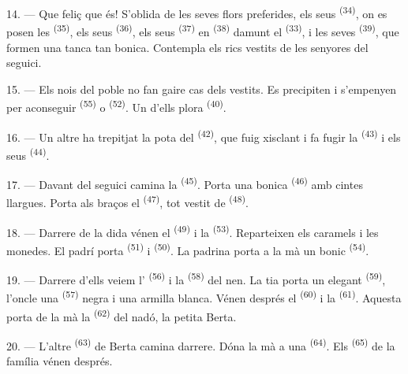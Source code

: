 14. --- Que feliç que és! S'oblida de les seves flors preferides, els seus
 \textsuperscript{(34)}, on es posen les 
\textsuperscript{(35)}, els seus  \textsuperscript{(36)}, els
seus  \textsuperscript{(37)} en 
\textsuperscript{(38)} damunt el  \textsuperscript{(33)}, i les seves
 \textsuperscript{(39)}, que formen una tanca tan bonica. Contempla
els rics vestits de les senyores del seguici.

15. --- Els nois del poble no fan gaire cas dels vestits. Es precipiten i
s'empenyen per aconseguir  \textsuperscript{(55)} o
 \textsuperscript{(52)}. Un d'ells plora
\textsuperscript{(40)}.

16. --- Un altre ha trepitjat la pota del  \textsuperscript{(42)}, que
fuig xisclant i fa fugir la  \textsuperscript{(43)} i els seus
 \textsuperscript{(44)}.

\VUsaut{5.0mm}
\VUsaut{4.0mm}

17. --- Davant del seguici camina la  \textsuperscript{(45)}. Porta
una bonica  \textsuperscript{(46)} amb cintes llargues. Porta als
braços el  \textsuperscript{(47)}, tot vestit de 
\textsuperscript{(48)}.

18. --- Darrere de la dida vénen el  \textsuperscript{(49)} i la
 \textsuperscript{(53)}. Reparteixen els caramels i les monedes.
El padrí porta  \textsuperscript{(51)} i 
\textsuperscript{(50)}. La padrina porta a la mà un bonic 
\textsuperscript{(54)}.

19. --- Darrere d'ells veiem l' \textsuperscript{(56)} i la
 \textsuperscript{(58)} del nen. La tia porta un elegant
 \textsuperscript{(59)}, l'oncle una 
\textsuperscript{(57)} negra i una armilla blanca. Vénen després el 
\textsuperscript{(60)} i la  \textsuperscript{(61)}. Aquesta porta
de la mà la  \textsuperscript{(62)} del nadó, la petita Berta.

20. --- L'altre  \textsuperscript{(63)} de Berta camina darrere. Dóna
la mà a una  \textsuperscript{(64)}. Els 
\textsuperscript{(65)} de la família vénen després.

